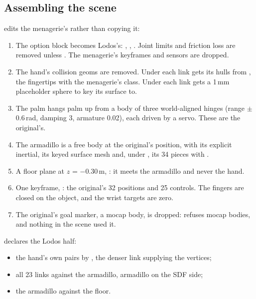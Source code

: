 \subsection{Assembling the scene}\label{sec:exscene}

 edits the menagerie's  rather than copying it:

\begin{enumerate}
\item The option block becomes Lodos's: , , . Joint limits and friction loss are removed unless . The menagerie's keyframes and sensors are dropped.
\item The hand's collision geoms are removed. Under  each link gets its hulls from , the fingertips with the menagerie's  class. Under  each link gets a 1\,mm placeholder sphere to key its surface to.
\item The palm hangs palm up from a  body of three world-aligned hinges (range $\pm$0.6\,rad, damping 3, armature 0.02), each driven by a  servo. These are the original's.
\item The armadillo is a free body at the original's position, with its explicit inertial, its keyed surface mesh and, under , its 34 pieces with .
\item A floor plane at $z$ = $-$0.30\,m, : it meets the armadillo and never the hand.
\item One keyframe, : the original's 32 positions and 25 controls. The fingers are closed on the object, and the wrist targets are zero.
\item The original's goal marker, a mocap body, is dropped:  refuses mocap bodies, and nothing in the scene used it.
\end{enumerate}

 declares the Lodos half:

\begin{itemize}
\item the hand's own pairs by , the denser link supplying the vertices;
\item all 23 links against the armadillo, armadillo on the SDF side;
\item the armadillo against the floor.
\end{itemize}

